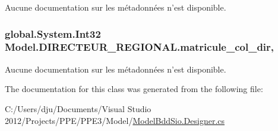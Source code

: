 Aucune documentation sur les métadonnées n'est disponible. 

\hypertarget{class_model_1_1_d_i_r_e_c_t_e_u_r___r_e_g_i_o_n_a_l_af8f929e9e0dd4f9a73d90d9f234a83d2}{
\subsubsection[{matricule\-\_\-col\-\_\-dir}]{\setlength{\rightskip}{0pt plus 5cm}global.\-System.\-Int32 Model.\-D\-I\-R\-E\-C\-T\-E\-U\-R\-\_\-\-R\-E\-G\-I\-O\-N\-A\-L.\-matricule\-\_\-col\-\_\-dir\hspace{0.3cm}{\ttfamily [get]}, {\ttfamily [set]}}}\label{class_model_1_1_d_i_r_e_c_t_e_u_r___r_e_g_i_o_n_a_l_af8f929e9e0dd4f9a73d90d9f234a83d2}


Aucune documentation sur les métadonnées n'est disponible. 



The documentation for this class was generated from the following file\-:\begin{DoxyCompactItemize}
\item 
C\-:/\-Users/dju/\-Documents/\-Visual Studio 2012/\-Projects/\-P\-P\-E/\-P\-P\-E3/\-Model/\hyperlink{_model_bdd_sio_8_designer_8cs}{Model\-Bdd\-Sio.\-Designer.\-cs}\end{DoxyCompactItemize}
